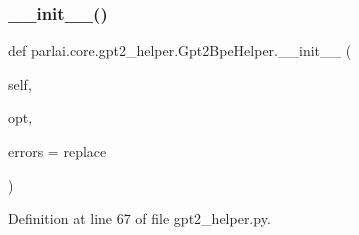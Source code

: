 \subsubsection{\texorpdfstring{\+\_\+\+\_\+init\+\_\+\+\_\+()}{\_\_init\_\_()}}
{\footnotesize\ttfamily def parlai.\+core.\+gpt2\+\_\+helper.\+Gpt2\+Bpe\+Helper.\+\_\+\+\_\+init\+\_\+\+\_\+ (\begin{DoxyParamCaption}\item[{}]{self,  }\item[{}]{opt,  }\item[{}]{errors = {\ttfamily \textquotesingle{}replace\textquotesingle{}} }\end{DoxyParamCaption})}



Definition at line 67 of file gpt2\+\_\+helper.\+py.


